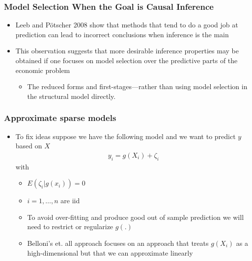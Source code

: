 \documentclass[
  shownotes,
  xcolor={svgnames},
  hyperref={colorlinks,citecolor=DarkBlue,linkcolor=DarkRed,urlcolor=DarkBlue}
  , aspectratio=169]{beamer}
\begin{document}
\begin{frame}[fragile]
\frametitle{Model Selection When the Goal is Causal Inference}


\begin{itemize}  
\item Leeb and Pötscher 2008 show that methods that tend to do a good job at prediction can lead to incorrect conclusions when inference is the main 
\medskip
\item This observation suggests that more desirable inference properties may be obtained if one focuses on model selection over the predictive parts of the economic problem
\begin{itemize}
\item The reduced forms and first-stages—rather than using model selection in the structural model directly.
\end{itemize}

\end{itemize}

\end{frame}
\begin{frame}[fragile]
\frametitle{Approximate sparse models}

\begin{itemize}
  \item To fix ideas suppose we have the following model and we want to predict $y$ based on $X$
  \begin{align}
  y_i=g(X_i) + \zeta_i
  \end{align}
  with 
  \begin{itemize}
    \item $E(\zeta_i|g(x_i))=0$
    \item $i=1,\dots,n$ are iid
    \item To avoid over-fitting and produce good out of sample prediction we will need to restrict or regularize $g(.)$
    \item Belloni's et. all approach focuses on an approach that treats $g(X_i)$ as a high-dimensional but that we can approximate linearly
  
  \end{itemize}
\end{itemize}

\end{frame}
\end{document}
